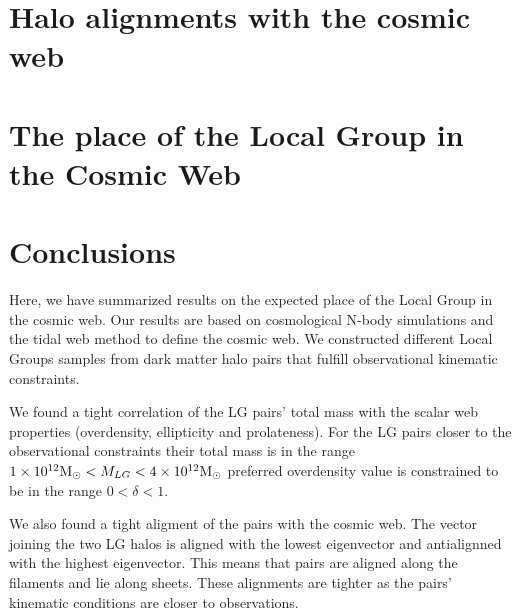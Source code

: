 \documentclass{iau}
\newcommand{\Msun}{{\ifmmode{{\rm {M_{\odot}}}}\else{${\rm{M_{\odot}}}$}\fi}}
\begin{document}
\section{Halo alignments with the cosmic web}

\section{The place of the Local Group in the Cosmic Web}

\section{Conclusions}

Here, we have summarized results on the expected place of the Local
Group in the cosmic web. Our results are based on cosmological N-body
simulations and the tidal web method to define the cosmic web. We
constructed different Local Groups samples from dark matter halo pairs
that fulfill observational kinematic constraints. 

We found a tight correlation of the LG pairs' total mass with the scalar
web properties (overdensity, ellipticity and prolateness). For the LG
pairs closer to the observational constraints their total mass is in
the range $1\times 10^{12}\Msun < M_{LG} < 4\times 10^{12}\Msun$
preferred overdensity value is constrained to be in the range
$0<\delta <1$. 

We also found a tight aligment of the pairs with the cosmic web. The
vector joining the two LG halos is aligned with the lowest eigenvector
and antialignned with the highest eigenvector. This means that pairs
are aligned along the filaments and lie along sheets. These alignments
are tighter as the pairs' kinematic conditions are closer to
observations.


 
\end{document}
